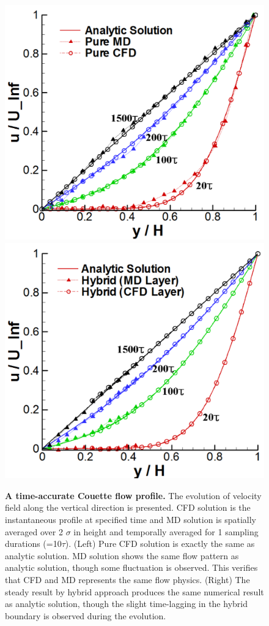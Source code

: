 \documentclass[preprint,12pt]{elsarticle}
\begin{document}
\begin{figure}
\centering
\includegraphics[width=0.6\linewidth]{Flat_Plate_Sol1.pdf}
\hskip 1cm
\includegraphics[width=0.6\linewidth]{Flat_Plate_Sol2.pdf}
\vskip-0.2cm
\caption{\small {\bf A time-accurate Couette flow profile.} The evolution of velocity field along the vertical direction is presented. CFD solution is the instantaneous profile at specified time and MD solution is spatially averaged over 2 $\sigma$ in height and temporally averaged for 1 sampling durations (=10$\tau$). (Left) Pure CFD solution is exactly the same as analytic solution. MD solution shows the same flow pattern as analytic solution, though some fluctuation is observed. This verifies that CFD and MD represents the same flow physics. (Right) The steady result by hybrid approach produces the same numerical result as analytic solution, though the slight time-lagging in the hybrid boundary is observed during the evolution.}
\label{Flat_Plate_Sol}
\end{figure}


\end{document}
